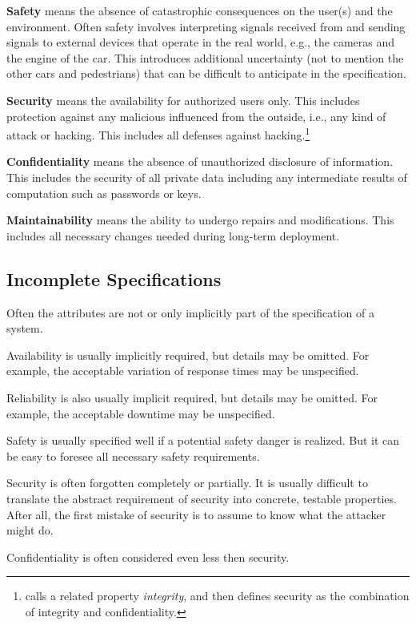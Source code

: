 \textbf{Safety} means the absence of catastrophic consequences on the user(s) and the environment.
Often safety involves interpreting signals received from and sending signals to external devices that operate in the real world, e.g., the cameras and the engine of the car.
This introduces additional uncertainty (not to mention the other cars and pedestrians) that can be difficult to anticipate in the specification.

\textbf{Security} means the availability for authorized users only.
This includes protection against any malicious influenced from the outside, i.e., any kind of attack or hacking.
This includes all defenses against hacking.\footnote{\cite{dependability} calls a related property \emph{integrity}, and then defines security as the combination of integrity and confidentiality.}

\textbf{Confidentiality} means the absence of unauthorized disclosure of information.
This includes the security of all private data including any intermediate results of computation such as passwords or keys.

\textbf{Maintainability} means the ability to undergo repairs and modifications.
This includes all necessary changes needed during long-term deployment.

\subsection{Incomplete Specifications}

Often the attributes are not or only implicitly part of the specification of a system.

Availability is usually implicitly required, but details may be omitted.
For example, the acceptable variation of response times may be unspecified.

Reliability is also usually implicit required, but details may be omitted.
For example, the acceptable downtime may be unspecified.

Safety is usually specified well if a potential safety danger is realized.
But it can be easy to foresee all necessary safety requirements.

Security is often forgotten completely or partially.
It is usually difficult to translate the abstract requirement of security into concrete, testable properties.
After all, the first mistake of security is to assume to know what the attacker might do.

Confidentiality is often considered even less then security.

